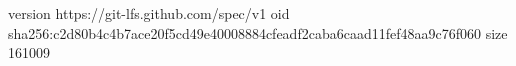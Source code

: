 version https://git-lfs.github.com/spec/v1
oid sha256:c2d80b4c4b7ace20f5cd49e40008884cfeadf2caba6caad11fef48aa9c76f060
size 161009
